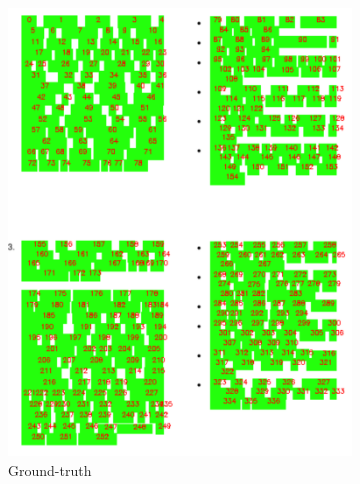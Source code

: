 \begin{figure}[!htbp]
  \centering
  \small
      \begin{subfigure}[b]{0.5\textwidth}
        \includegraphics[width=\textwidth]{images/chapter4/gold_multicolumn.pdf}
        \caption{Ground-truth}
      \end{subfigure}
      \begin{subfigure}[b]{0.5\textwidth}

\end{subfigure}
\end{figure}
